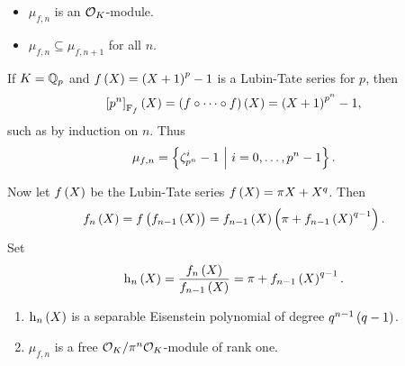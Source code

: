 \begin{fact*}
\hfill
\begin{itemize}
\item $ \mu_{f, n} $ is an $ \mathcal{O}_K $-module.
\item $ \mu_{f, n} \subseteq \mu_{f, n + 1} $ for all $ n $.
\end{itemize}
\end{fact*}

\begin{example*}
If $ K = \mathbb{Q}_p $ and $ f\br{X} = \br{X + 1}^p - 1 $ is a Lubin-Tate series for $ p $, then
$$ \sbr{p^n}_{\F_f}\br{X} = \br{f \circ \dots \circ f}\br{X} = \br{X + 1}^{p^n} - 1, $$
such as by induction on $ n $. Thus
$$ \mu_{f, n} = \cbr{\zeta_{p^n}^i - 1 \st i = 0, \dots, p^n - 1}. $$
\end{example*}

Now let $ f\br{X} $ be the Lubin-Tate series $ f\br{X} = \pi X + X^q $. Then
$$ f_n\br{X} = f\br{f_{n - 1}\br{X}} = f_{n - 1}\br{X}\br{\pi + f_{n - 1}\br{X}^{q - 1}}. $$
Set
$$ \h_n\br{X} = \dfrac{f_n\br{X}}{f_{n - 1}\br{X}} = \pi + f_{n - 1}\br{X}^{q - 1}. $$

\begin{proposition}
\label{prop:21.3}
\hfill
\begin{enumerate}
\item $ \h_n\br{X} $ is a separable Eisenstein polynomial of degree $ q^{n - 1}\br{q - 1} $.
\item $ \mu_{f, n} $ is a free $ \mathcal{O}_K / \pi^n\mathcal{O}_K $-module of rank one.
\end{enumerate}
\end{proposition}

